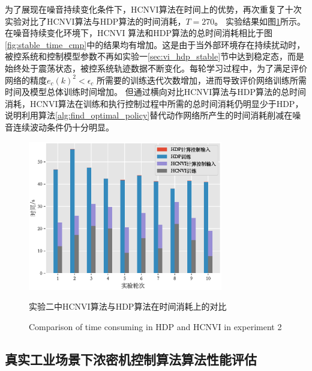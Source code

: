 为了展现在噪音持续变化条件下，HCNVI算法在时间上的优势，再次重复了十次实验对比了HCNVI算法与HDP算法的时间消耗，$T=270$。
实验结果如图\ref{fig:noise_time_cmp}所示。在噪音持续变化环境下，HCNVI
算法和HDP算法的总时间消耗相比于图\ref{fig:stable_time_cmp}中的结果均有增加。这是由于当外部环境存在持续扰动时，被控系统和控制模型参数不再如实验一\ref{sec:vi_hdp_stable}节中达到稳定态，而是始终处于震荡状态，被控系统轨迹数据不断变化。每轮学习过程中，为了满足评价网络的精度$e_{c}(k)^{2}<\epsilon_{c}$
所需要的训练迭代次数增加，进而导致评价网络训练所需时间及模型总体训练时间增加。
但通过横向对比HCNVI算法与HDP算法的总时间消耗，HCNVI算法在训练和执行控制过程中所需的总时间消耗仍明显少于HDP，说明利用算法\ref{alg:find_optimal_policy}替代动作网络所产生的时间消耗削减在噪音连续波动条件仍十分明显。


\begin{figure}[hpbt]
    \centering
    \includegraphics[width=8.5cm]{figures/chapter6/fig13.eps}
    \caption{实验二中HCNVI算法与HDP算法在时间消耗上的对比}

  \addtocounter{figure}{-1}
  \vspace{-5pt}
  \renewcommand{\figurename}{Fig.}
  \caption{Comparison of time consuming in HDP and HCNVI in experiment 2}
  \renewcommand{\figurename}{图}

    \label{fig:noise_time_cmp}
\end{figure}
\subsection{真实工业场景下浓密机控制算法算法性能评估}

